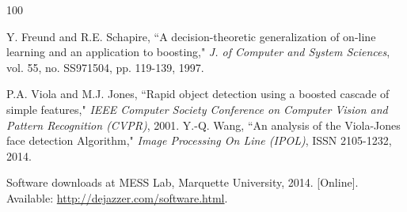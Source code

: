 \documentclass[conference]{IEEEtran}
\begin{document}
\begin {thebibliography}{100}


Y. Freund and R.E. Schapire, ``A decision-theoretic generalization of on-line learning and an application to boosting," \emph{J. of Computer and System Sciences}, vol. 55, no. SS971504, pp. 119-139, 1997.

P.A. Viola and M.J. Jones, ``Rapid object detection using a boosted cascade of simple features," \emph{IEEE Computer Society Conference on Computer Vision and Pattern Recognition (CVPR)}, 2001.
Y.-Q. Wang, ``An analysis of the Viola-Jones face detection Algorithm," \emph{Image Processing On Line (IPOL)}, ISSN 2105-1232, 2014.




Software downloads at MESS Lab, Marquette University, 2014. [Online]. Available: \url{http://dejazzer.com/software.html}.


\end {thebibliography}

\end{document}
